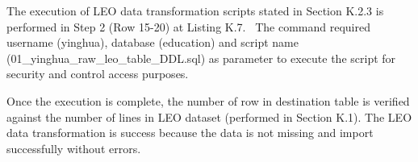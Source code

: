 The execution of LEO data transformation scripts stated in Section K.2.3 is performed in Step 2 (Row 15-20) at Listing K.7. 
\
The command required username (yinghua), database (education) and script name (01\_yinghua\_raw\_leo\_table\_DDL.sql) as parameter to execute the script for security and control access purposes. 

Once the execution is complete, the number of row in destination table is verified against the number of lines in LEO dataset (performed in Section K.1). The LEO data transformation is success because the data is not missing and import successfully without errors. 

\newpage







